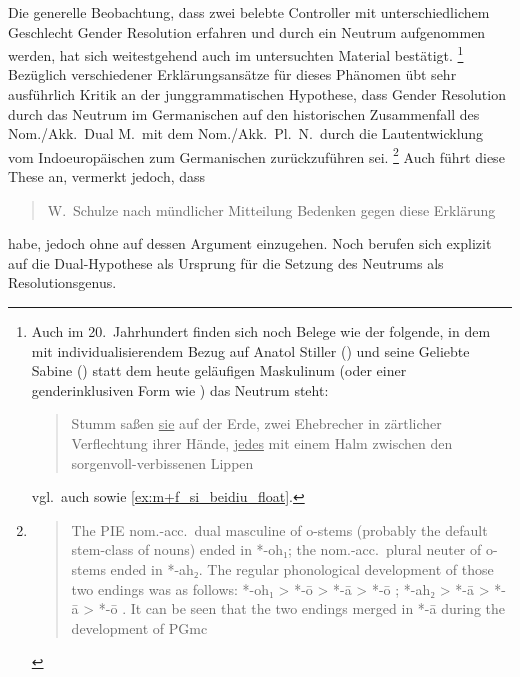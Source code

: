 Die generelle Beobachtung, dass zwei belebte Controller mit unterschiedlichem
Geschlecht Gender Resolution erfahren und durch ein Neutrum aufgenommen werden,
hat sich weitestgehend auch im untersuchten Material bestätigt.%
%
	\footnote{Auch im 20.~Jahrhundert finden sich noch Belege wie der folgende,
		in dem mit individualisierendem Bezug auf Anatol Stiller (\MascM) und
		seine Geliebte Sabine (\FemF) statt dem heute geläufigen Maskulinum
		(oder einer genderinklusiven Form wie ) das Neutrum steht:
		\blockquote[{\cites(Hervorhebung und Annotation
		CB)[332--333]{frisch:stiller}}]{Stumm saßen
		\ul{sie}  auf der Erde, zwei Ehebrecher in
		zärtlicher Verflechtung ihrer Hände, \ul{jedes}
		 mit einem Halm zwischen den
		sorgenvoll-ver\-bis\-senen Lippen \textelp{}};
		vgl.~auch \textcite[188]{dal2014} sowie \cref{ex:m+f_si_beidiu_float}.
	}
%
Bezüglich verschiedener Erklärungs\-ansätze für dieses Phänomen übt
\citet[213--221]{askedal1973} sehr ausführlich Kritik an der junggrammatischen
Hypothese, dass Gender Resolution durch das Neutrum im Germanischen auf den
historischen Zusammenfall des Nom./Akk.\ Dual M.\ mit dem Nom./Akk.~Pl.~N.\
durch die Laut\-entwicklung vom Indoeuropäischen zum Germanischen
zurückzuführen sei.%
%
	\footnote{\foreignblockcquote{english}[196]{ringe2017}{The PIE nom.-acc.\
		dual masculine of o-stems (probably the default stem-class of nouns)
		ended in *-oh₁; the nom.-acc.\ plural neuter of o-stems ended in *-ah₂.
		The regular phonological development of those two endings was as
		follows: *-oh₁ > *-ō \textelp{} > *-ā > *-ō \textelp{}; *-ah₂ > *-ā
		\textelp{} > *-ā > *-ō \textelp{}. It can be seen that the two endings
		merged in *-ā during the development of PGmc}.%
	}
%
Auch \citeauthor{behaghel1928} führt diese These an, vermerkt jedoch, dass
\blockcquote[40]{behaghel1928}{W.~Schulze \textelp{} nach mündlicher Mitteilung
Bedenken gegen diese Erklärung} habe, jedoch ohne auf dessen Argument
einzugehen. Noch \textcites[157]{hock2008}[196]{ringe2017}[104]{miller2019}
berufen sich explizit auf die Dual-Hypothese als Ursprung für die Setzung des
Neutrums als Resolutionsgenus.


